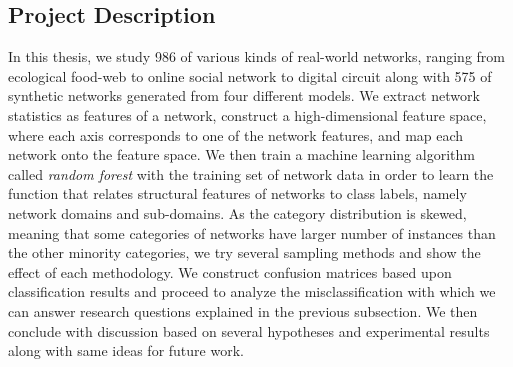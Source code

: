 \subsection{Project Description}

In this thesis, we study 986 of various kinds of real-world networks, ranging from ecological food-web to online social network to digital circuit along with 575 of synthetic networks generated from four different models. We extract network statistics as features of a network, construct a high-dimensional feature space, where each axis corresponds to one of the network features, and map each network onto the feature space. We then train a machine learning algorithm called \textit{random forest} with the training set of network data in order to learn the function that relates structural features of networks to class labels, namely network domains and sub-domains. As the category distribution is skewed, meaning that some categories of networks have larger number of instances than the other minority categories, we try several sampling methods and show the effect of each methodology. We construct confusion matrices based upon classification results and proceed to analyze the misclassification with which we can answer research questions explained in the previous subsection. We then conclude with discussion based on several hypotheses and experimental results along with same ideas for future work.
